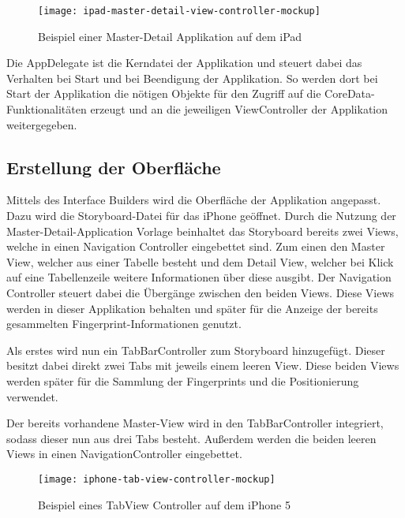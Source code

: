 \begin{figure}[htb!]
		\centering
	\texttt{[image: ipad-master-detail-view-controller-mockup]}
	\caption{Beispiel einer Master-Detail Applikation auf dem iPad}
	\label{master-detail-view-controller}
\end{figure}

Die AppDelegate ist die Kerndatei der Applikation und steuert dabei das Verhalten bei Start und bei Beendigung der Applikation. So werden dort bei Start der Applikation die nötigen Objekte für den Zugriff auf die CoreData-Funktionalitäten erzeugt und an die jeweiligen ViewController der Applikation weitergegeben.


\subsection{Erstellung der Oberfläche}
\label{sec:}

Mittels des Interface Builders wird die Oberfläche der Applikation angepasst. Dazu wird die Storyboard-Datei für das iPhone geöffnet.
Durch die Nutzung der Master-Detail-Application Vorlage beinhaltet das Storyboard bereits zwei Views, welche in einen Navigation Controller eingebettet sind. 
Zum einen den Master View, welcher aus einer Tabelle besteht und dem Detail View, welcher bei Klick auf eine Tabellenzeile weitere Informationen über diese ausgibt. 
Der Navigation Controller steuert dabei die Übergänge zwischen den beiden Views.
Diese Views werden in dieser Applikation behalten und später für die Anzeige der bereits gesammelten Fingerprint-Informationen genutzt.

Als erstes wird nun ein TabBarController zum Storyboard hinzugefügt. Dieser besitzt dabei direkt zwei Tabs mit jeweils einem leeren View. Diese beiden Views werden später für die Sammlung der Fingerprints und die Positionierung verwendet.

Der bereits vorhandene Master-View wird in den TabBarController integriert, sodass dieser nun aus drei Tabs besteht. Außerdem werden die beiden leeren Views in einen NavigationController eingebettet.

\begin{figure}[htb!]
		\centering
	\texttt{[image: iphone-tab-view-controller-mockup]}
	\caption{Beispiel eines TabView Controller auf dem iPhone 5}
	\label{iphone-tab-view-controller}
\end{figure}

